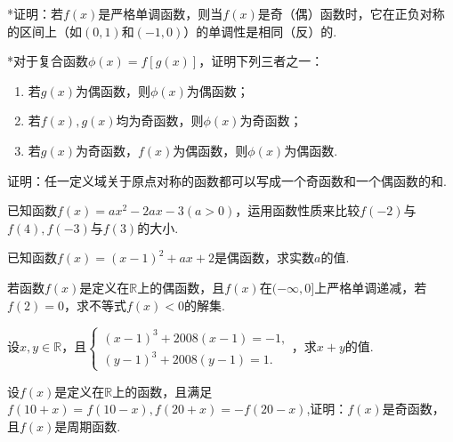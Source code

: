 \documentclass[lang=cn,math=cm,chinesefont=nofont,11pt,scheme=chinese,twocol]{elegantbook}
\begin{document}
\begin{exercise}
  *证明：若$f(x)$是严格单调函数，则当$f(x)$是奇（偶）函数时，它在正负对称的区间上（如$(0,1)$和$(-1,0)$）的单调性是相同（反）的.
\end{exercise}

\begin{exercise}
  *对于复合函数$\phi(x)=f[g(x)]$，证明下列三者之一：
\end{exercise}

\begin{enumerate}
  \item 若$g(x)$为偶函数，则$\phi(x)$为偶函数；
  \item 若$f(x),g(x)$均为奇函数，则$\phi(x)$为奇函数；
  \item 若$g(x)$为奇函数，$f(x)$为偶函数，则$\phi(x)$为偶函数.
\end{enumerate}

\begin{exercise}
  证明：任一定义域关于原点对称的函数都可以写成一个奇函数和一个偶函数的和.
\end{exercise}

\begin{exercise}\label{2017RJB_bx1_P111.B7}
  已知函数$f(x)=ax^2-2ax-3(a>0)$，运用函数性质来比较$f(-2)$与$f(4),f(-3)$与$f(3)$的大小.
\end{exercise}

\begin{exercise}\label{2017RJB_bx1_P111.B8}
  已知函数$f(x)=(x-1)^2+ax+2$是偶函数，求实数$a$的值.
\end{exercise}

\begin{exercise}\label{2017RJB_bx1_P111.C2}
  若函数$f(x)$是定义在$\mathbb{R}$上的偶函数，且$f(x)$在$(-\infty,0]$上严格单调递减，若$f(2)=0$，求不等式$f(x)<0$的解集.
\end{exercise}

\begin{exercise}\label{ASJC_G1_P30.11}
  设$x,y\in\mathbb{R}$，且$\begin{cases}(x-1)^3+2008(x-1)=-1,\\(y-1)^3+2008(y-1)=1.\end{cases}$，求$x+y$的值.
\end{exercise}

\begin{exercise}\label{HS2FZ_lkb1_P57.3}
  设$f(x)$是定义在$\mathbb{R}$上的函数，且满足$f(10+x)=f(10-x),f(20+x)=-f(20-x)$,证明：$f(x)$是奇函数，且$f(x)$是周期函数.
\end{exercise}
\end{document}
